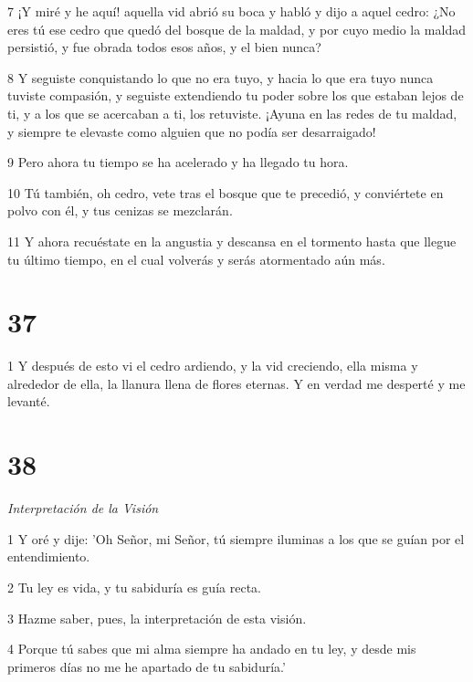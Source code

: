 \par 7 ¡Y miré y he aquí! aquella vid abrió su boca y habló y dijo a aquel cedro: ¿No eres tú ese cedro que quedó del bosque de la maldad, y por cuyo medio la maldad persistió, y fue obrada todos esos años, y el bien nunca?

\par 8 Y seguiste conquistando lo que no era tuyo, y hacia lo que era tuyo nunca tuviste compasión, y seguiste extendiendo tu poder sobre los que estaban lejos de ti, y a los que se acercaban a ti, los retuviste. ¡Ayuna en las redes de tu maldad, y siempre te elevaste como alguien que no podía ser desarraigado!

\par 9 Pero ahora tu tiempo se ha acelerado y ha llegado tu hora.

\par 10 Tú también, oh cedro, vete tras el bosque que te precedió, y conviértete en polvo con él, y tus cenizas se mezclarán.

\par 11 Y ahora recuéstate en la angustia y descansa en el tormento hasta que llegue tu último tiempo, en el cual volverás y serás atormentado aún más.

\chapter{37}

\par 1 Y después de esto vi el cedro ardiendo, y la vid creciendo, ella misma y alrededor de ella, la llanura llena de flores eternas. Y en verdad me desperté y me levanté.

\chapter{38}

\par \textit{Interpretación de la Visión}

\par 1 Y oré y dije: 'Oh Señor, mi Señor, tú siempre iluminas a los que se guían por el entendimiento.

\par 2 Tu ley es vida, y tu sabiduría es guía recta.

\par 3 Hazme saber, pues, la interpretación de esta visión.

\par 4 Porque tú sabes que mi alma siempre ha andado en tu ley, y desde mis primeros días no me he apartado de tu sabiduría.'

